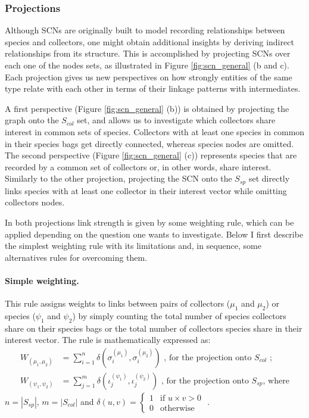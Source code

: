 \documentclass[a4paper]{article}
\begin{document}

\subsubsection{Projections}

Although SCNs are originally built to model recording relationships between species and collectors, one might obtain additional insights by deriving indirect relationships from its structure. This is accomplished by projecting SCNs over each one of the nodes sets, as illustrated in Figure \ref{fig:scn_general} (b and c). Each projection gives us new perspectives on how strongly entities of the same type relate with each other in terms of their linkage patterns with intermediates.

A first perspective (Figure \ref{fig:scn_general} (b)) is obtained by projecting the graph onto the $S_{col}$ set, and allows us to investigate which collectors share interest in common sets of species. Collectors with at least one species in common in their species bags get directly connected, whereas species nodes are omitted. The second perspective (Figure \ref{fig:scn_general} (c)) represents species that are recorded by a common set of collectors or, in other words, share interest. Similarly to the other projection, projecting the SCN onto the $S_{sp}$ set directly links species with at least one collector in their interest vector while omitting collectors nodes.

In both projections link strength is given by some weighting rule, which can be applied depending on the question one wants to investigate. Below I first describe the simplest weighting rule with its limitations and, in sequence, some alternatives rules for overcoming them.

\paragraph{Simple weighting.}
This rule assigns weights to links between pairs of collectors ($\mu_1$ and $\mu_2$) or species ($\psi_1$ and $\psi_2$) by simply counting the total number of species collectors share on their species bags or the total number of collectors species share in their interest vector. The rule is mathematically expressed as:
\begin{equation*}
\begin{split}
W_{(\mu_1, \mu_2)} &= \sum_{i=1}^{n} \delta(\sigma_i^{(\mu_1)}, \sigma_i^{(\mu_2)})\mbox{ , for the projection onto }S_{col}\mbox{ ;}\\
W_{(\psi_1, \psi_2)} &= \sum_{j=1}^{m} \delta(\iota_j^{(\psi_1)}, \iota_j^{(\psi_2)})
\mbox{ , for the projection onto }S_{sp}\mbox{, where}
\end{split}
\end{equation*}
$n = |S_{sp}|$, $m = |S_{col}|$ and 
$\delta(u,v) = 
\begin{cases}
1 & \mbox{if } u \times v > 0\\
0 & \mbox{otherwise}
\end{cases}
$ .
\end{document}
